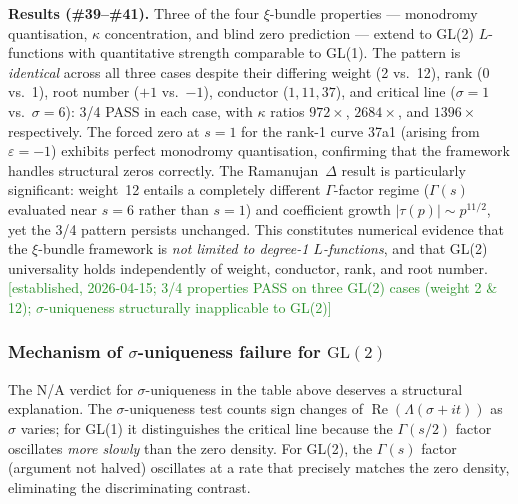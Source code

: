 \documentclass[11pt, a4paper]{article}
\theoremstyle{definition}
\theoremstyle{plain}
\begin{document}
\medskip\noindent
\textbf{Results (\#39--\#41).}
Three of the four $\xi$-bundle properties --- monodromy quantisation,
$\kappa$ concentration, and blind zero prediction --- extend to
GL(2) $L$-functions with quantitative strength comparable
to GL(1).  The pattern is \emph{identical} across all three cases despite
their differing weight (2 vs.\ 12), rank (0 vs.\ 1), root number ($+1$ vs.\ $-1$),
conductor ($1, 11, 37$), and critical line ($\sigma = 1$ vs.\ $\sigma = 6$):
3/4 PASS in each case, with $\kappa$ ratios $972\times$, $2684\times$,
and $1396\times$ respectively.
The forced zero at $s = 1$ for the rank-1 curve 37a1 (arising from
$\varepsilon = -1$) exhibits perfect monodromy quantisation,
confirming that the framework handles structural zeros correctly.
The Ramanujan~$\Delta$ result is particularly significant: weight~12
entails a completely different $\Gamma$-factor regime
($\Gamma(s)$ evaluated near $s = 6$ rather than $s = 1$) and
coefficient growth $|\tau(p)| \sim p^{11/2}$, yet the 3/4 pattern
persists unchanged.
This constitutes numerical evidence that the $\xi$-bundle
framework is \emph{not limited to degree-1 $L$-functions},
and that GL(2) universality holds independently of weight,
conductor, rank, and root number.
\textcolor{ForestGreen}{[established, 2026-04-15; 3/4 properties PASS on three GL(2) cases
(weight 2 \& 12); $\sigma$-uniqueness structurally inapplicable to GL(2)]}

\subsubsection{Mechanism of $\sigma$-uniqueness failure for $\mathrm{GL}(2)$}
\label{sec:sigma_uniqueness_mechanism}

The N/A verdict for $\sigma$-uniqueness in the table above deserves a
structural explanation.  The $\sigma$-uniqueness test counts sign changes
of $\operatorname{Re}(\Lambda(\sigma+it))$ as $\sigma$ varies; for GL(1)
it distinguishes the critical line because the $\Gamma(s/2)$ factor
oscillates \emph{more slowly} than the zero density.
For GL(2), the $\Gamma(s)$ factor (argument not halved) oscillates at
a rate that precisely matches the zero density, eliminating the
discriminating contrast.
\end{document}
